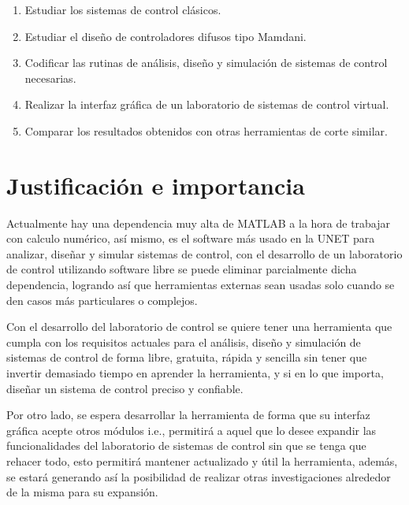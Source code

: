 		\begin{enumerate}[leftmargin=\parindent]
			
			\item Estudiar los sistemas de control clásicos.
			
			\item Estudiar el diseño de controladores difusos tipo Mamdani.
			
			\item Codificar las rutinas de análisis, diseño y simulación de sistemas de control necesarias.
			
			\item Realizar la interfaz gráfica de un laboratorio de sistemas de control virtual.
			
			\item Comparar los resultados obtenidos con otras herramientas de corte similar.
		
	\end{enumerate}

\section{Justificación e importancia}
	
	Actualmente hay una dependencia muy alta de MATLAB a la hora de trabajar con calculo numérico, así mismo, es el software más usado en la UNET para analizar, diseñar y simular sistemas de control, con el desarrollo de un laboratorio de control utilizando software libre se puede eliminar parcialmente dicha dependencia, logrando así que herramientas externas sean usadas solo cuando se den casos más particulares o complejos.
	
	Con el desarrollo del laboratorio de control se quiere tener una herramienta que cumpla con los requisitos actuales para el análisis, diseño y simulación de sistemas de control de forma libre, gratuita, rápida y sencilla sin tener que invertir demasiado tiempo en aprender la herramienta, y si en lo que importa, diseñar un sistema de control preciso y confiable.
	
	Por otro lado, se espera desarrollar la herramienta de forma que su interfaz gráfica acepte otros módulos i.e., permitirá a aquel que lo desee expandir las funcionalidades del laboratorio de sistemas de control sin que se tenga que rehacer todo, esto permitirá mantener actualizado y útil la herramienta, además, se estará generando así la posibilidad de realizar otras investigaciones alrededor de la misma para su expansión.
	
